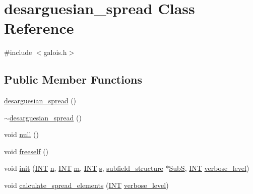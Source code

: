 \hypertarget{classdesarguesian__spread}{}\section{desarguesian\+\_\+spread Class Reference}
\label{classdesarguesian__spread}


{\ttfamily \#include $<$galois.\+h$>$}

\subsection*{Public Member Functions}
\begin{DoxyCompactItemize}
\item 
\mbox{\hyperlink{classdesarguesian__spread_a1a661c494663456995aa2951cfca2753}{desarguesian\+\_\+spread}} ()
\item 
\mbox{\hyperlink{classdesarguesian__spread_a3b5240d9f81e5732a1b15fb2f61c86b0}{$\sim$desarguesian\+\_\+spread}} ()
\item 
void \mbox{\hyperlink{classdesarguesian__spread_a344fe2b921d6dfc533a7f6b2c6ec92b9}{null}} ()
\item 
void \mbox{\hyperlink{classdesarguesian__spread_a2a3ae6452c76199aeb316fec8a8fa14a}{freeself}} ()
\item 
void \mbox{\hyperlink{classdesarguesian__spread_a6729ce39e1af501df742b194deb98165}{init}} (\mbox{\hyperlink{galois_8h_a09fddde158a3a20bd2dcadb609de11dc}{I\+NT}} \mbox{\hyperlink{classdesarguesian__spread_a4a9fd5642b270a866775d8c370491a29}{n}}, \mbox{\hyperlink{galois_8h_a09fddde158a3a20bd2dcadb609de11dc}{I\+NT}} \mbox{\hyperlink{classdesarguesian__spread_a447549ee12cd9e852d5ac14a1c4937a1}{m}}, \mbox{\hyperlink{galois_8h_a09fddde158a3a20bd2dcadb609de11dc}{I\+NT}} \mbox{\hyperlink{classdesarguesian__spread_ad0a57698b2975f3a15538eb572127b43}{s}}, \mbox{\hyperlink{classsubfield__structure}{subfield\+\_\+structure}} $\ast$\mbox{\hyperlink{classdesarguesian__spread_a37ff42bc23a84c3134679820f6956cae}{SubS}}, \mbox{\hyperlink{galois_8h_a09fddde158a3a20bd2dcadb609de11dc}{I\+NT}} \mbox{\hyperlink{simeon_8_c_a818073fbcc2f439e7c56952f67386122}{verbose\+\_\+level}})
\item 
void \mbox{\hyperlink{classdesarguesian__spread_a39cf4777b15fa59ee42673b91c144732}{calculate\+\_\+spread\+\_\+elements}} (\mbox{\hyperlink{galois_8h_a09fddde158a3a20bd2dcadb609de11dc}{I\+NT}} \mbox{\hyperlink{simeon_8_c_a818073fbcc2f439e7c56952f67386122}{verbose\+\_\+level}})
\item 

\end{DoxyCompactItemize}
